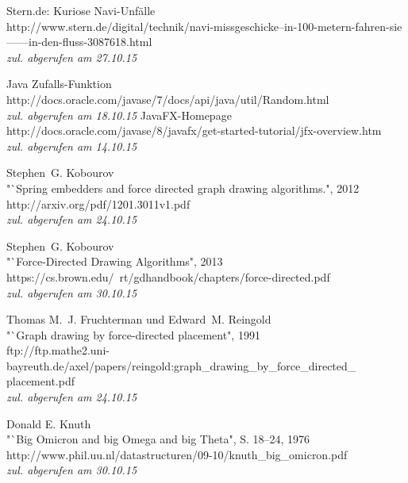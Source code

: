 \documentclass[12pt]{article}
\begin{document}
%
%
\begin{thebibliography}{99}
 Stern.de: Kuriose Navi-Unfälle\\
\newblock http://www.stern.de/digital/technik/navi-missgeschicke--in-100-metern-fahren-sie------in-den-fluss-3087618.html \\\emph{zul. abgerufen am 27.10.15}

 Java Zufalls-Funktion\\
\newblock http://docs.oracle.com/javase/7/docs/api/java/util/Random.html \\\emph{zul. abgerufen am 18.10.15}
 JavaFX-Homepage\\
\newblock http://docs.oracle.com/javase/8/javafx/get-started-tutorial/jfx-overview.htm \\\emph{zul. abgerufen am 14.10.15}

 Stephen~G. Kobourov\\
\newblock "`Spring embedders and force directed graph drawing algorithms.", 2012\\
\newblock http://arxiv.org/pdf/1201.3011v1.pdf \\\emph{zul. abgerufen am 24.10.15}

 Stephen~G. Kobourov\\
\newblock "`Force-Directed Drawing Algorithms", 2013\\
\newblock https://cs.brown.edu/~rt/gdhandbook/chapters/force-directed.pdf \\\emph{zul. abgerufen am 30.10.15}

 Thomas M.~J. Fruchterman und Edward~M. Reingold\\
\newblock "`Graph drawing by force-directed placement", 1991\\
\newblock ftp://ftp.mathe2.uni-bayreuth.de/axel/papers/reingold:graph{\_}drawing{\_}by{\_}force{\_}directed{\_}\\placement.pdf \\\emph{zul. abgerufen am 24.10.15}

 Donald E. Knuth\\
\newblock "`Big Omicron and big Omega and big Theta", S. 18--24, 1976\\
\newblock http://www.phil.uu.nl/datastructuren/09-10/knuth{\_}big{\_}omicron.pdf  \\\emph{zul. abgerufen am 30.10.15}


\end{thebibliography}
\end{document}
